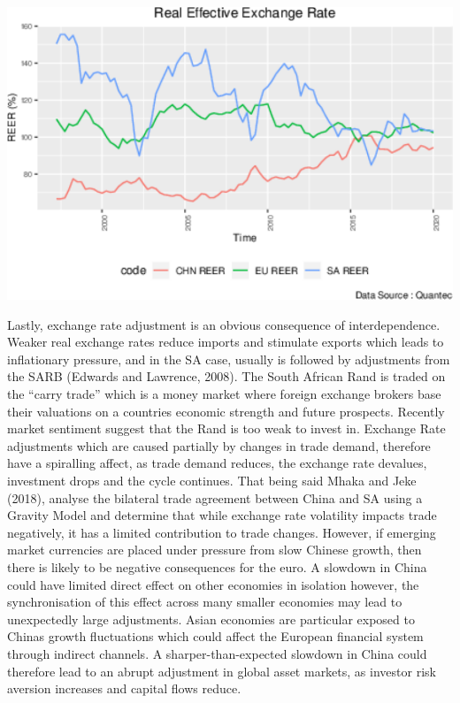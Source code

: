 \documentclass[11pt,preprint, authoryear]{elsarticle}
\let\origfigure\figure
\let\endorigfigure\endfigure
\renewenvironment{figure}[1][2] {
    \expandafter\origfigure\expandafter[H]
} {
    \endorigfigure
}
\numberwithin{equation}{section}
\numberwithin{figure}{section}
\numberwithin{table}{section}
\begin{document}
\begin{figure}[H]

{\centering \includegraphics{tradedynamics1_files/figure-latex/Graph11-1} 

}

\caption{Real Effective Exchange Rate in China, SA and the EU \label{Graph11}}\label{fig:Graph11}
\end{figure}

Lastly, exchange rate adjustment is an obvious consequence of
interdependence. Weaker real exchange rates reduce imports and stimulate
exports which leads to inflationary pressure, and in the SA case,
usually is followed by adjustments from the SARB (Edwards and Lawrence,
2008). The South African Rand is traded on the ``carry trade'' which is
a money market where foreign exchange brokers base their valuations on a
countries economic strength and future prospects. Recently market
sentiment suggest that the Rand is too weak to invest in. Exchange Rate
adjustments which are caused partially by changes in trade demand,
therefore have a spiralling affect, as trade demand reduces, the
exchange rate devalues, investment drops and the cycle continues. That
being said Mhaka and Jeke (2018), analyse the bilateral trade agreement
between China and SA using a Gravity Model and determine that while
exchange rate volatility impacts trade negatively, it has a limited
contribution to trade changes. However, if emerging market currencies
are placed under pressure from slow Chinese growth, then there is likely
to be negative consequences for the euro. A slowdown in China could have
limited direct effect on other economies in isolation however, the
synchronisation of this effect across many smaller economies may lead to
unexpectedly large adjustments. Asian economies are particular exposed
to Chinas growth fluctuations which could affect the European financial
system through indirect channels. A sharper-than-expected slowdown in
China could therefore lead to an abrupt adjustment in global asset
markets, as investor risk aversion increases and capital flows reduce.
\end{document}
